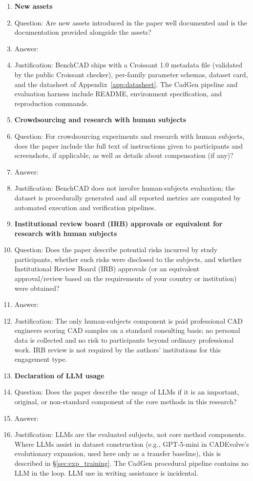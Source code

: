 \begin{enumerate}
\item {\bf New assets}
    \item[] Question: Are new assets introduced in the paper well documented and is the documentation provided alongside the assets?
    \item[] Answer: \answerYes{}
    \item[] Justification: BenchCAD ships with a Croissant 1.0 metadata file (validated by the public Croissant checker), per-family parameter schemas, dataset card, and the datasheet of Appendix~\ref{app:datasheet}. The CadGen pipeline and evaluation harness include README, environment specification, and reproduction commands.

\item {\bf Crowdsourcing and research with human subjects}
    \item[] Question: For crowdsourcing experiments and research with human subjects, does the paper include the full text of instructions given to participants and screenshots, if applicable, as well as details about compensation (if any)?
    \item[] Answer: \answerYes{}
    \item[] Justification: BenchCAD does not involve human-subjects evaluation; the dataset is procedurally generated and all reported metrics are computed by automated execution and verification pipelines.

\item {\bf Institutional review board (IRB) approvals or equivalent for research with human subjects}
    \item[] Question: Does the paper describe potential risks incurred by study participants, whether such risks were disclosed to the subjects, and whether Institutional Review Board (IRB) approvals (or an equivalent approval/review based on the requirements of your country or institution) were obtained?
    \item[] Answer: \answerNA{}
    \item[] Justification: The only human-subjects component is paid professional CAD engineers scoring CAD samples on a standard consulting basis; no personal data is collected and no risk to participants beyond ordinary professional work. IRB review is not required by the authors' institutions for this engagement type.

\item {\bf Declaration of LLM usage}
    \item[] Question: Does the paper describe the usage of LLMs if it is an important, original, or non-standard component of the core methods in this research?
    \item[] Answer: \answerYes{}
    \item[] Justification: LLMs are the evaluated subjects, not core method components. Where LLMs assist in dataset construction (e.g., GPT-5-mini in CADEvolve's evolutionary expansion, used here only as a transfer baseline), this is described in \S\ref{sec:exp_training}. The CadGen procedural pipeline contains no LLM in the loop. LLM use in writing assistance is incidental.

\end{enumerate}
